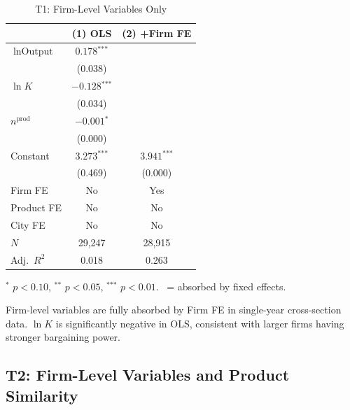 \documentclass[12pt]{article}
\newcommand{\sym}[1]{\ensuremath{^{\text{#1}}}}
\newcommand{\se}[1]{{\small(#1)}}
\newcommand{\abs}{\textemdash}
\begin{document}
\begin{table}[H]
  \centering
  \caption{T1: Firm-Level Variables Only}
  \label{tab:t1}
  \begin{threeparttable}
    \begin{tabular}{lcc}
      \toprule
      & (1) OLS & (2) +Firm FE \\
      \midrule
      \(\ln \text{Output}\) & \(0.178\sym{***}\) & \abs \\
                             & \se{0.038}         & \\[4pt]
      \(\ln K\)              & \(-0.128\sym{***}\) & \abs \\
                             & \se{0.034}          & \\[4pt]
      \(n^{\text{prod}}\)    & \(-0.001\sym{*}\)  & \abs \\
                             & \se{0.000}         & \\[4pt]
      Constant               & \(3.273\sym{***}\) & \(3.941\sym{***}\) \\
                             & \se{0.469}         & \se{0.000} \\
      \midrule
      Firm FE     & No  & Yes \\
      Product FE  & No  & No  \\
      City FE     & No  & No  \\
      \(N\)       & 29,247 & 28,915 \\
      Adj.\ \(R^2\) & 0.018 & 0.263 \\
      \bottomrule
    \end{tabular}
    \begin{tablenotes}[flushleft]
      \footnotesize
      \item \sym{*} \(p<0.10\), \sym{**} \(p<0.05\), \sym{***} \(p<0.01\).
        \abs\ = absorbed by fixed effects.
      \item Firm-level variables are fully absorbed by Firm FE in
        single-year cross-section data. \(\ln K\) is significantly negative
        in OLS, consistent with larger firms having stronger bargaining power.
    \end{tablenotes}
  \end{threeparttable}
\end{table}

\subsection{T2: Firm-Level Variables and Product Similarity}
\label{sec:t2}
\end{document}
